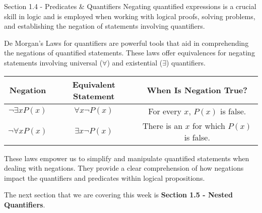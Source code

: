 \begin{notes}{Section 1.4 - Predicates \& Quantifiers}
    Negating quantified expressions is a crucial skill in logic and is employed when working with logical proofs, solving problems, and establishing the negation of statements involving quantifiers.    

    De Morgan's Laws for quantifiers are powerful tools that aid in comprehending the negations of quantified statements. These laws offer equivalences for negating statements involving universal (\(\forall\)) and existential (\(\exists\)) quantifiers.
    
    \begin{center}
        \begin{tabular}{|c|c|c|}
            \hline \textbf{Negation} & \textbf{Equivalent Statement} & \textbf{When Is Negation True?} \\ \hline
            \(\neg \exists x P(x)\) & \(\forall x \neg P(x)\) & For every \(x\), \(P(x)\) is false. \\ \hline
            \(\neg \forall x P(x)\) & \(\exists x \neg P(x)\) & There is an \(x\) for which \(P(x)\) is false. \\ \hline
        \end{tabular}
    \end{center}
    
    These laws empower us to simplify and manipulate quantified statements when dealing with negations. They provide a clear comprehension of how negations impact the quantifiers and predicates within logical propositions.
\end{notes}

The next section that we are covering this week is \textbf{Section 1.5 - Nested Quantifiers}.

